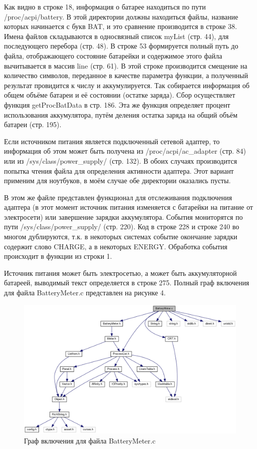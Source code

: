 \documentclass[a4paper, 12pt]{article}		%
\begin{document}
Как видно в строке 18, информация о батарее находиться по пути /proc/acpi/battery. В этой директории должны находиться файлы, название которых начинается с букв BAT, и это сравнение производится в строке 38. Имена файлов складываются в односвязный список myList (стр. 44), для последующего перебора (стр. 48). В строке 53 формируется полный путь до файла, отображающего состояние батарейки и содержимое этого файла вычитывается в массив line (стр. 61). В этой строке производится смещение на количество символов, переданное в качестве параметра функции, а полученный результат провидится к числу и аккумулируется. Так собирается информация об общем объёме батареи и её состоянии (остатке заряда). Сбор осуществляет функция getProcBatData в стр. 186. Эта же функция определяет процент использования аккумулятора, путём деления остатка заряда на общий объём батареи (стр. 195).

Если источником питания является подключенный сетевой адаптер, то информация об этом может быть получена из /proc/acpi/ac\_adapter (стр. 84) или из /sys/class/power\_supply/ (стр. 132). В обоих случаях производится попытка чтения файла для определения активности адаптера. Этот вариант применим для ноутбуков, в моём случае обе директории оказались пусты.

В этом же файле представлен функционал для отслеживания подключения адаптера (в этот момент источник питания изменяется с батарейки на питание от электросети) или завершение зарядки аккумулятора. События мониторятся по пути /sys/class/power\_supply/ (стр. 220). Код в строке 228 и строке 240 во многом дублируются, т.к. в некоторых системах событие окончание зарядки содержит слово CHARGE, а в некоторых ENERGY. Обработка события происходит в функции из строки 1.

Источник питания может быть электросетью, а может быть аккумуляторной батареей, выводимый текст определяется в строке 275. Полный граф включения для файла BatteryMeter.c представлен на рисунке 4.

\newpage


\begin{figure}[h!]
\centering
\includegraphics[scale=0.45]{res/battery_meter.png}
\caption{Граф включения для файла BatteryMeter.c}
\end{figure}
\end{document}
